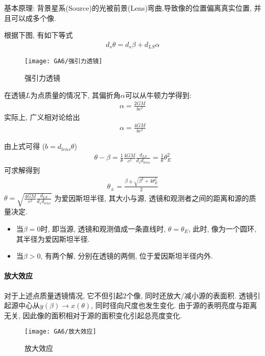 基本原理: 背景星系(Source)的光被前景(Lens)弯曲,导致像的位置偏离真实位置, 并且可以成多个像. 

根据下图, 有如下等式
\begin{align*}
    d_s \theta =d_s \beta+d_{LS}\alpha
\end{align*}
\begin{figure}[!htb]
    \centering
    \texttt{[image: GA6/强引力透镜]}
    \caption{强引力透镜}
\end{figure}
在透镜$L$为点质量的情况下, 其偏折角$\alpha$可以从牛顿力学得到: 
\begin{align*}
    \alpha=\frac{2GM}{bc^2}
\end{align*}
实际上, 广义相对论给出
\begin{align*}
    \alpha=\frac{4GM}{bc^2}
\end{align*}

由上式可得 ($b=d_{lens}\theta$)
\begin{align*}
    \theta-\beta=\frac{1}{\theta}\frac{4GM}{c^2}\frac{d_{LS}}{d_s d_{lens}}=\frac{1}{\theta}\theta_E^2
\end{align*}
可求解得到
\begin{align*}
    \theta_{\pm}=\frac{\beta \pm \sqrt{\beta^2+4\theta_E^2}}{2}
\end{align*}
$\displaystyle\theta=\sqrt{\frac{4GM}{c^2}\frac{d_{LS}}{d_s d_{lens}}}$ 为爱因斯坦半径, 其大小与源, 透镜和观测者之间的距离和源的质量决定. 

\begin{itemize}\small
    \item 当$\beta=0$时, 即当源, 透镜和观测值成一条直线时,  $\theta=\theta_E$, 此时, 像为一个圆环, 其半径为爱因斯坦半径. 
    \item 当$\beta>0$, 有两个解, 分别在透镜的两侧, 位于爱因斯坦半径内外. 
\end{itemize}

\paragraph{放大效应}
对于上述点质量透镜情况, 它不但引起2个像, 同时还放大/减小源的表面积. 透镜引起源中心从$y(\beta)\rightarrow x(\theta)$, 同时径向尺度也发生变化. 由于源的表明亮度与距离无关, 因此像的面积相对于源的面积变化引起总亮度变化. 

\begin{figure}[!htb]
    \centering
    \texttt{[image: GA6/放大效应]}
    \caption{放大效应}
\end{figure}

